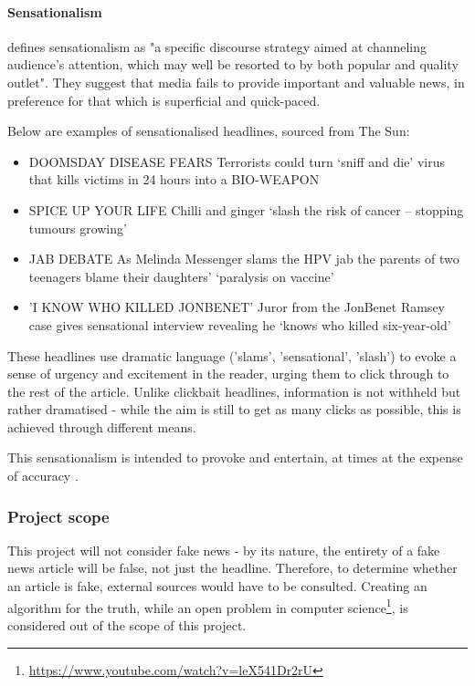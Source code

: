 \paragraph{Sensationalism}
 defines sensationalism as "a specific discourse strategy  aimed  at  channeling  audience's  attention,  which  may  well  be  resorted  to  by  both  popular and quality outlet". They suggest that media fails to provide important and valuable news, in preference for that which is superficial and quick-paced.


Below are examples of sensationalised headlines, sourced from The Sun:

\begin{itemize}
	\item DOOMSDAY DISEASE FEARS Terrorists could turn ‘sniff and die’ virus that kills victims in 24 hours into a BIO-WEAPON
	\item SPICE UP YOUR LIFE Chilli and ginger ‘slash the risk of cancer – stopping tumours growing’
	\item JAB DEBATE As Melinda Messenger slams the HPV jab the parents of two teenagers blame their daughters’ ‘paralysis on vaccine’
	\item 'I KNOW WHO KILLED JONBENET' Juror from the JonBenet Ramsey case gives sensational interview revealing he ‘knows who killed six-year-old’
	
\end{itemize}

These headlines use dramatic language ('slams', 'sensational', 'slash') to evoke a sense of urgency and excitement in the reader, urging them to click through to the rest of the article. Unlike clickbait headlines, information is not withheld but rather dramatised - while the aim is still to get as many clicks as possible, this is achieved through different means.

This sensationalism is intended to provoke and entertain, at times at the expense of accuracy \cite{chesney2017}.

\subsubsection{Project scope}
This project will not consider fake news - by its nature, the entirety of a fake news article will be false, not just the headline. Therefore, to determine whether an article is fake, external sources would have to be consulted. Creating an algorithm for the truth, while an open problem in computer science\footnote{\url{https://www.youtube.com/watch?v=leX541Dr2rU}}, is considered out of the scope of this project.

